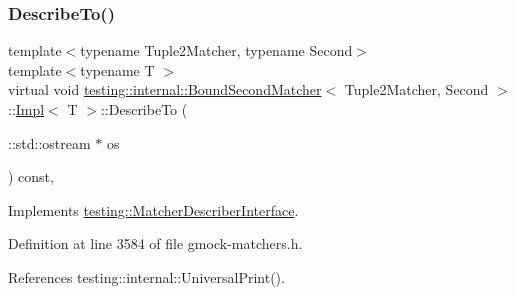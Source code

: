 \subsubsection{\texorpdfstring{Describe\+To()}{DescribeTo()}}
{\footnotesize\ttfamily template$<$typename Tuple2\+Matcher, typename Second$>$ \\
template$<$typename T $>$ \\
virtual void \hyperlink{classtesting_1_1internal_1_1BoundSecondMatcher}{testing\+::internal\+::\+Bound\+Second\+Matcher}$<$ Tuple2\+Matcher, Second $>$\+::\hyperlink{classtesting_1_1internal_1_1BoundSecondMatcher_1_1Impl}{Impl}$<$ T $>$\+::Describe\+To (\begin{DoxyParamCaption}\item[{\+::std\+::ostream $\ast$}]{os }\end{DoxyParamCaption}) const\hspace{0.3cm}{\ttfamily [inline]}, {\ttfamily [virtual]}}



Implements \hyperlink{classtesting_1_1MatcherDescriberInterface_ad9f861588bd969b6e3e717f13bb94e7b}{testing\+::\+Matcher\+Describer\+Interface}.



Definition at line 3584 of file gmock-\/matchers.\+h.



References testing\+::internal\+::\+Universal\+Print().


